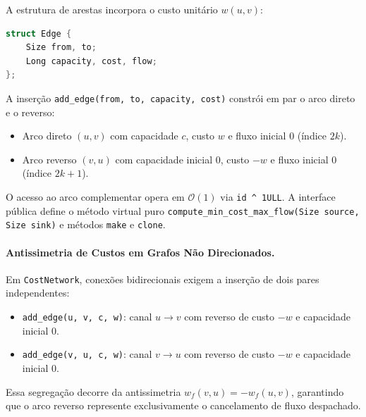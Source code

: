 A estrutura de arestas incorpora o custo unitário $w(u,v)$:
\begin{lstlisting}[language=C++, numbers=none, basicstyle=\ttfamily\footnotesize, frame=none, backgroundcolor=\color{white}]
struct Edge {
    Size from, to;
    Long capacity, cost, flow;
};
\end{lstlisting}

A inserção \lstinline{add_edge(from, to, capacity, cost)} constrói em par o arco direto e o reverso:
\begin{itemize}
    \item Arco direto $(u,v)$ com capacidade $c$, custo $w$ e fluxo inicial $0$ (índice $2k$).
    \item Arco reverso $(v,u)$ com capacidade inicial $0$, custo $-w$ e fluxo inicial $0$ (índice $2k+1$).
\end{itemize}

O acesso ao arco complementar opera em $\mathcal{O}(1)$ via \lstinline{id ^ 1ULL}. A interface pública define o método virtual puro \lstinline{compute_min_cost_max_flow(Size source, Size sink)} e métodos \lstinline{make} e \lstinline{clone}.

\paragraph{Antissimetria de Custos em Grafos Não Direcionados.} Em \lstinline{CostNetwork}, conexões bidirecionais exigem a inserção de dois pares independentes:
\begin{itemize}
    \item \lstinline{add_edge(u, v, c, w)}: canal $u \to v$ com reverso de custo $-w$ e capacidade inicial 0.
    \item \lstinline{add_edge(v, u, c, w)}: canal $v \to u$ com reverso de custo $-w$ e capacidade inicial 0.
\end{itemize}
Essa segregação decorre da antissimetria $w_f(v, u) = -w_f(u, v)$, garantindo que o arco reverso represente exclusivamente o cancelamento de fluxo despachado.


